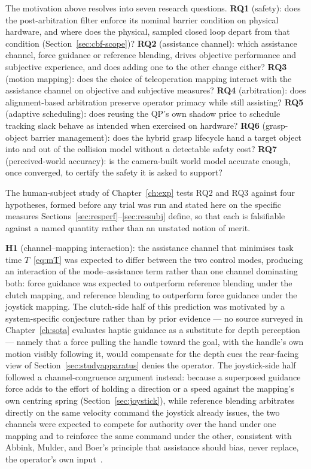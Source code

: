 \documentclass[12pt,a4paper,twoside,openright]{report}
\begin{document}
The motivation above resolves into seven research questions. \textbf{RQ1} (safety): does the post-arbitration filter enforce its nominal barrier condition on physical hardware, and where does the physical, sampled closed loop depart from that condition (Section~\ref{sec:cbf-scope})? \textbf{RQ2} (assistance channel): which assistance channel, force guidance or reference blending, drives objective performance and subjective experience, and does adding one to the other change either? \textbf{RQ3} (motion mapping): does the choice of teleoperation mapping interact with the assistance channel on objective and subjective measures? \textbf{RQ4} (arbitration): does alignment-based arbitration preserve operator primacy while still assisting? \textbf{RQ5} (adaptive scheduling): does reusing the QP's own shadow price to schedule tracking slack behave as intended when exercised on hardware? \textbf{RQ6} (grasp-object barrier management): does the hybrid grasp lifecycle hand a target object into and out of the collision model without a detectable safety cost? \textbf{RQ7} (perceived-world accuracy): is the camera-built world model accurate enough, once converged, to certify the safety it is asked to support?

The human-subject study of Chapter~\ref{ch:exp} tests RQ2 and RQ3 against four hypotheses, formed before any trial was run and stated here on the specific measures Sections~\ref{sec:resperf}--\ref{sec:ressubj} define, so that each is falsifiable against a named quantity rather than an unstated notion of merit.

\textbf{H1} (channel--mapping interaction): the assistance channel that minimises task time $T$~\eqref{eq:mT} was expected to differ between the two control modes, producing an interaction of the mode--assistance term rather than one channel dominating both: force guidance was expected to outperform reference blending under the clutch mapping, and reference blending to outperform force guidance under the joystick mapping. The clutch-side half of this prediction was motivated by a system-specific conjecture rather than by prior evidence --- no source surveyed in Chapter~\ref{ch:sota} evaluates haptic guidance as a substitute for depth perception --- namely that a force pulling the handle toward the goal, with the handle's own motion visibly following it, would compensate for the depth cues the rear-facing view of Section~\ref{sec:studyapparatus} denies the operator. The joystick-side half followed a channel-congruence argument instead: because a superposed guidance force adds to the effort of holding a direction or a speed against the mapping's own centring spring (Section~\ref{sec:joystick}), while reference blending arbitrates directly on the same velocity command the joystick already issues, the two channels were expected to compete for authority over the hand under one mapping and to reinforce the same command under the other, consistent with Abbink, Mulder, and Boer's principle that assistance should bias, never replace, the operator's own input~\cite{abbink2012hapticshared}.
\end{document}
